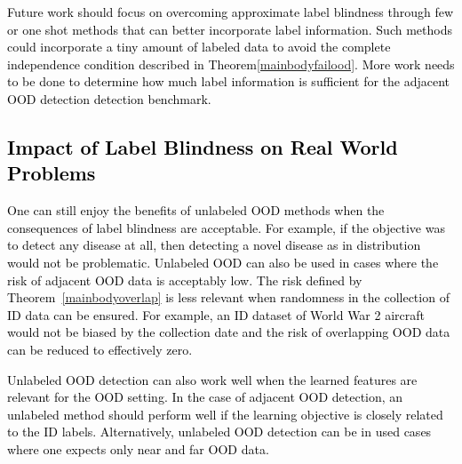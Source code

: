 \documentclass{article} %
\theoremstyle{plain}
\theoremstyle{definition}
\theoremstyle{remark}
\begin{document}
\textcolor{black}{Future work should focus on overcoming approximate label blindness through few or one shot methods that can better incorporate label information. Such methods could incorporate a tiny amount of labeled data to avoid the complete independence condition described in Theorem\ref{mainbodyfailood}.  More work needs to be done to determine how much label information is sufficient for the adjacent OOD detection detection benchmark.}

\vspace{-2mm}\subsection{\textcolor{black}{Impact of Label Blindness on Real World Problems}}\vspace{-2mm}

\textcolor{black}{One can still enjoy the benefits of unlabeled OOD methods when the consequences of label blindness are acceptable. For example, if the objective was to detect any disease at all, then detecting a novel disease as in distribution would not be problematic. Unlabeled OOD can also be used in cases where the risk of adjacent OOD data is acceptably low. The risk defined by Theorem~\ref{mainbodyoverlap} is less relevant when randomness in the collection of ID data can be ensured. For example, an ID dataset of World War 2 aircraft would not be biased by the collection date and the risk of overlapping OOD data can be reduced to effectively zero.}

\textcolor{black}{Unlabeled OOD detection can also work well when the learned features are relevant for the OOD setting. In the case of adjacent OOD detection, an unlabeled method should perform well if the learning objective is closely related to the ID labels. Alternatively, unlabeled OOD detection can be in used cases where one expects only near and far OOD data.}  




\textcolor{black}{}


 

\end{document}
